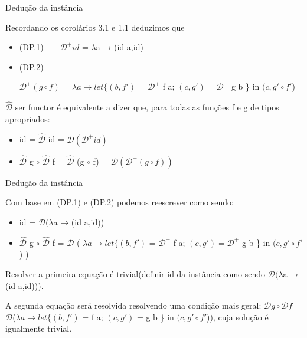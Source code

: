 \documentclass{beamer}
\begin{document}
\begin{frame}{Dedução da instância}

Recordando os corolários 3.1 e 1.1 deduzimos que
\begin{itemize}
    \item (DP.1) ---- $\mathcal{D}^{+} id$ = $\lambda$a → (id a,id)
    \item (DP.2) ----
    
    $\mathcal{D}^{+}(g \circ f)$ = $\lambda a → let\{(b,f')$ = $\mathcal{D}^{+}$ f a; $(c,g') = \mathcal{D}^{+}$ g b \} in $(c,g' \circ f'$)   
\end{itemize}

$\mathcal{\hat{D}}$ ser functor é equivalente a dizer que, para todas as funções f e g de tipos apropriados:

\begin{itemize}
    \item id = $\mathcal{\hat{D}}$ id = $\mathcal{D} (\mathcal{D}^{+} id)$
    \item $\mathcal{\hat{D}}$ g $\circ$ $\mathcal{\hat{D}}$ f = $\mathcal{\hat{D}}$  (g $\circ$ f) = $\mathcal{D} (\mathcal{D}^{+} (g \circ f))$
\end{itemize}

\end{frame}


\begin{frame}{Dedução da instância}

Com base em (DP.1) e (DP.2) podemos reescrever como sendo:
\begin{itemize}
    \item id = $\mathcal{D} (\lambda$a → (id a,id))
    \item $\mathcal{\hat{D}}$ g $\circ$ $\mathcal{\hat{D}}$ f = $\mathcal{D}$ ( $\lambda a → let\{(b,f')$ = $\mathcal{D}^{+}$ f a; $(c,g') = \mathcal{D}^{+}$ g b \} in $(c,g' \circ f'$) )
\end{itemize}

Resolver a primeira equação é trivial(definir id da instância como sendo $\mathcal{D} (\lambda$a → (id a,id))).


A segunda equação será resolvida resolvendo uma condição mais geral:
$\mathcal{D} g \circ \mathcal{D} f$ = $\mathcal{D}$($\lambda a → let\{(b,f')$ = f a; $(c,g')$ = g b \} in $(c,g' \circ f'$)), cuja solução é igualmente trivial.


\end{frame}
\end{document}
